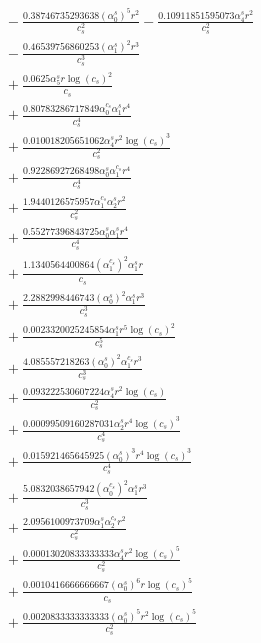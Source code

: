 \documentclass[10pt]{article}
\begin{document}
\begin{align*}
&{}  - \frac{0.38746735293638 \left(\alpha_{0}^s\right)^{5} r^{2}}{c_{s}^{2}} - \frac{0.10911851595073 \alpha_{4}^s r^{2}}{c_{s}^{2}} \\
&{}  - \frac{0.46539756860253 \left(\alpha_{1}^s\right)^{2} r^{3}}{c_{s}^{3}} \\
&{}  + \frac{0.0625 \alpha_{5}^s r \log{\left(c_{s} \right)}^{2}}{c_{s}} \\
&{}  + \frac{0.80783286717849 \alpha_{0}^{c_s} \alpha_{1}^s r^{4}}{c_{s}^{4}} \\
&{}  + \frac{0.010018205651062 \alpha_{4}^s r^{2} \log{\left(c_{s} \right)}^{3}}{c_{s}^{2}} \\
&{}  + \frac{0.92286927268498 \alpha_{0}^s \alpha_{1}^{c_s} r^{4}}{c_{s}^{4}} \\
&{}  + \frac{1.9440126575957 \alpha_{1}^{c_s} \alpha_{2}^s r^{2}}{c_{s}^{2}} \\
&{}  + \frac{0.55277396843725 \alpha_{0}^s \alpha_{1}^s r^{4}}{c_{s}^{4}} \\
&{}  + \frac{1.1340564400864 \left(\alpha_{1}^{c_s}\right)^{2} \alpha_{1}^s r}{c_{s}} \\
&{}  + \frac{2.2882998446743 \left(\alpha_{0}^s\right)^{2} \alpha_{1}^s r^{3}}{c_{s}^{3}} \\
&{}  + \frac{0.0023320025245854 \alpha_{1}^s r^{5} \log{\left(c_{s} \right)}^{2}}{c_{s}^{5}} \\
&{}  + \frac{4.085557218263 \left(\alpha_{0}^s\right)^{2} \alpha_{1}^{c_s} r^{3}}{c_{s}^{3}} \\
&{}  + \frac{0.093222530607224 \alpha_{4}^s r^{2} \log{\left(c_{s} \right)}}{c_{s}^{2}} \\
&{}  + \frac{0.00099509160287031 \alpha_{2}^s r^{4} \log{\left(c_{s} \right)}^{3}}{c_{s}^{4}} \\
&{}  + \frac{0.015921465645925 \left(\alpha_{0}^s\right)^{3} r^{4} \log{\left(c_{s} \right)}^{3}}{c_{s}^{4}} \\
&{}  + \frac{5.0832038657942 \left(\alpha_{0}^{c_s}\right)^{2} \alpha_{1}^s r^{3}}{c_{s}^{3}} \\
&{}  + \frac{2.0956100973709 \alpha_{1}^s \alpha_{2}^{c_s} r^{2}}{c_{s}^{2}} \\
&{}  + \frac{0.00013020833333333 \alpha_{4}^s r^{2} \log{\left(c_{s} \right)}^{5}}{c_{s}^{2}} \\
&{}  + \frac{0.0010416666666667 \left(\alpha_{0}^s\right)^{6} r \log{\left(c_{s} \right)}^{5}}{c_{s}} \\
&{}  + \frac{0.0020833333333333 \left(\alpha_{0}^s\right)^{5} r^{2} \log{\left(c_{s} \right)}^{5}}{c_{s}^{2}} \\

\end{align*}
\end{document}
